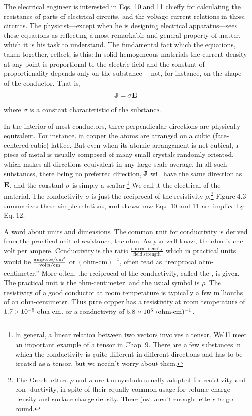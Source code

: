 The electrical engineer is interested in Eqs. 10 and 11 chieffy for
calculating the resistance of parts of electrical circuits, and the
voltage-current relations in those circuits. The physicist---except
when he is designing electrical apparatus---sees these equations as
reflecting a most remarkable and general property of matter, which
it is his task to understand. The fundamental fact which the 
equations, taken together, reflect, is this: In solid homogeneous materials
the current density at any point is proportional to the electric field
and the constant of proportionality depends only on the substance---
not, for instance, on the shape of the conductor. That is,
\begin{equation}
  \mathbf{J}=\sigma\mathbf{E}
\end{equation}
where $\sigma$ is a constant characteristic of the substance.

In the interior of most conductors, three perpendicular directions
are physically equivalent. For instance, in copper the atoms are
arranged on a cubic (face-centered cubic) lattice. But even when
its atomic arrangement is not cubical, a piece of metal is usually
composed of many small crystals randomly oriented, which makes
all directions equivalent in any large-scale average. In all such 
substances, there being no preferred direction, $\mathbf{J}$ will have the same
direction as $\mathbf{E}$, and the constant $\sigma$ is simply a 
sca1ar.\footnote{ln general, a linear relation between two vectors involves a tensor. We'1l meet an
important example of a tensor in Chap. 9. There are a few substances in which the
conductivity is quite different in different directions and has to be treated as a tensor,
but we needn't worry about them.} 
We call it the
electrical  of the material. The conductivity $\sigma$ is just the
reciprocal of the resistivity 
$\rho$.\footnote{The Greek letters $\rho$ and $\sigma$ are the symbols usually adopted for resistivity and con-
ductivity, in spite of their equally common usage for volume charge density and surface
charge density. There just aren't enough letters to go round.} Figure 4.3 summarizes these simple
relations, and shows how Eqs. 10 and 11 are implied by Eq. 12.


A word about units and dimensions. The common unit for conductivity
is derived from the practical unit of resistance, the ohm. As
you well know, the ohm is one volt per ampere. Conductivity is the
ratio $\frac{\text{current density}}{\text{field strength}}$
which in practical units would be
$\frac{\textup{amperes}/\textup{cm}^2}{\textup{volts}/\textup{cm}}$
or $(\text{ohm-cm})^{-1}$, often read as ``reciprocal ohm-centimeter.'' More
often, the reciprocal of the conductivity, called the , is given.
The practical unit is the ohm-centimeter, and the usual symbol is $\rho$.
The resistivity of a good conductor at room temperature is typically
a few millionths of an ohm-centimeter. Thus pure copper has a
resistivity at room temperature of $1.7 \times 10^{-6}\ \zu{ohm-cm}$, or a conductivity
of $5.8\times 10^5\ (\textup{ohm-cm})^{-1}$.

